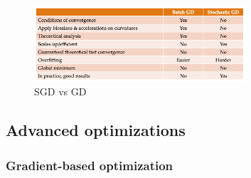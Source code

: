 \begin{figure}[ht!]
	\centering
	\includegraphics[width=0.7\textwidth]{figures/SGDvsGD.png}
	\caption{SGD vs GD}
	\label{fig:SGDvsGD}
\end{figure}
\subsection{Advanced optimizations}
\subsubsection{Gradient-based optimization}
